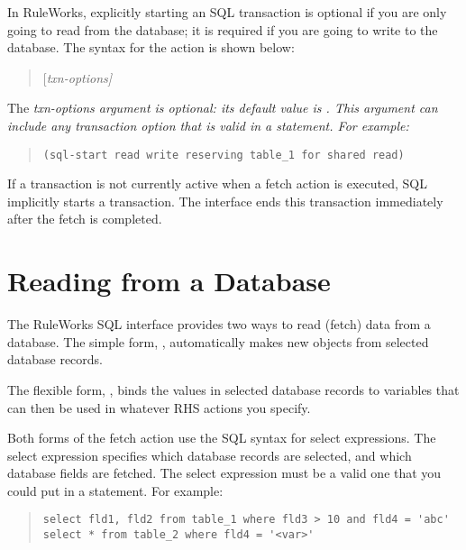 In RuleWorks, explicitly starting an SQL transaction is optional if
you are only going to read from the database; it is required if you
are going to write to the database. The syntax for the 
action is shown below:

\begin{quote}
 [\it{txn-options}]
\end{quote}

The \it{txn-options} argument is optional: its default value is
. This argument can include any transaction option that
is valid in a  statement. For example:

\begin{quote}
\begin{verbatim}
(sql-start read write reserving table_1 for shared read)
\end{verbatim}
\end{quote}

If a transaction is not currently active when a fetch action is
executed, SQL implicitly starts a  transaction. The
interface ends this transaction immediately after the fetch is
completed.

\section{Reading from a Database}

The RuleWorks SQL interface provides two ways to read (fetch) data
from a database. The simple form, , automatically
makes new objects from selected database records.

The flexible form, , binds the values in selected
database records to variables that can then be used in whatever RHS
actions you specify.

Both forms of the fetch action use the SQL syntax for select
expressions. The select expression specifies which database records
are selected, and which database fields are fetched. The select
expression must be a valid one that you could put in a 
statement.  For example:

\begin{quote}
\begin{verbatim}
select fld1, fld2 from table_1 where fld3 > 10 and fld4 = 'abc'
select * from table_2 where fld4 = '<var>'
\end{verbatim}
\end{quote}

